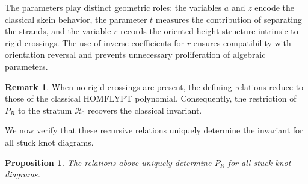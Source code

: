 \documentclass[11pt,a4paper]{article}
\theoremstyle{plain}
\newtheorem{proposition}[theorem]{Proposition}
\theoremstyle{definition}
\newtheorem{remark}[theorem]{Remark}
\begin{document}
The parameters play distinct geometric roles: the variables $a$ and $z$ encode the classical skein behavior, the parameter $t$ measures the contribution of separating the strands, and the variable $r$ records the oriented height structure intrinsic to rigid crossings. The use of inverse coefficients for $r$ ensures compatibility with orientation reversal and prevents unnecessary proliferation of algebraic parameters.


\begin{remark}
When no rigid crossings are present, the defining relations reduce to those of the classical HOMFLYPT polynomial. Consequently, the restriction of $P_R$ to the stratum $\mathcal{R}_0$ recovers the classical invariant.
\end{remark}

We now verify that these recursive relations uniquely determine the invariant for all stuck knot diagrams.

\begin{proposition}
The relations above uniquely determine $P_R$ for all stuck knot diagrams.
\end{proposition}
\end{document}
